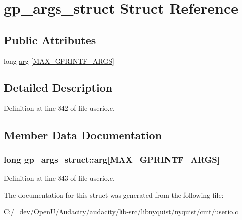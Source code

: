 \hypertarget{structgp__args__struct}{}\section{gp\+\_\+args\+\_\+struct Struct Reference}
\label{structgp__args__struct}
\subsection*{Public Attributes}
\begin{DoxyCompactItemize}
\item 
long \hyperlink{structgp__args__struct_abaca313deef97220096b905e1e8595b1}{arg} \mbox{[}\hyperlink{userio_8c_aa2200d5a1c7a51c404b8ba03dca3182b}{M\+A\+X\+\_\+\+G\+P\+R\+I\+N\+T\+F\+\_\+\+A\+R\+GS}\mbox{]}
\end{DoxyCompactItemize}


\subsection{Detailed Description}


Definition at line 842 of file userio.\+c.



\subsection{Member Data Documentation}
\subsubsection[{\texorpdfstring{arg}{arg}}]{\setlength{\rightskip}{0pt plus 5cm}long gp\+\_\+args\+\_\+struct\+::arg\mbox{[}{\bf M\+A\+X\+\_\+\+G\+P\+R\+I\+N\+T\+F\+\_\+\+A\+R\+GS}\mbox{]}}\hypertarget{structgp__args__struct_abaca313deef97220096b905e1e8595b1}{}\label{structgp__args__struct_abaca313deef97220096b905e1e8595b1}


Definition at line 843 of file userio.\+c.



The documentation for this struct was generated from the following file\+:\begin{DoxyCompactItemize}
\item 
C\+:/\+\_\+dev/\+Open\+U/\+Audacity/audacity/lib-\/src/libnyquist/nyquist/cmt/\hyperlink{userio_8c}{userio.\+c}\end{DoxyCompactItemize}
